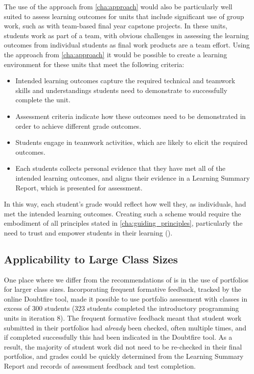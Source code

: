 The use of the approach from \cref{cha:approach} would also be particularly well suited to assess learning outcomes for units that include significant use of group work, such as with team-based final year capstone projects. In these units, students work as part of a team, with obvious challenges in assessing the learning outcomes from individual students as final work products are a team effort. Using the approach from \cref{cha:approach} it would be possible to create a learning environment for these units that meet the following criteria:
\begin{itemize}[noitemsep,nolistsep]
	\item Intended learning outcomes capture the required technical and teamwork skills and understandings students need to demonstrate to successfully complete the unit.
	\item Assessment criteria indicate how these outcomes need to be demonstrated in order to achieve different grade outcomes.
	\item Students engage in teamwork activities, which are likely to elicit the required outcomes.
	\item Each students collects personal evidence that they have met all of the intended learning outcomes, and aligns their evidence in a Learning Summary Report, which is presented for assessment.
\end{itemize}

In this way, each student's grade would reflect how well they, as individuals, had met the intended learning outcomes. Creating such a scheme would require the embodiment of all principles stated in \cref{cha:guiding_principles}, particularly the need to trust and empower students in their learning ().

\subsection{Applicability to Large Class Sizes} %
\label{sub:appli}


One place where we differ from the recommendations of \citet{Biggs:2007} is in the use of portfolios for larger class sizes. Incorporating frequent formative feedback, tracked by the online Doubtfire tool, made it possible to use portfolio assessment with classes in excess of 300 students (323 students completed the introductory programming units in iteration 8). The frequent formative feedback meant that student work submitted in their portfolios had \emph{already} been checked, often multiple times, and if completed successfully this had been indicated in the Doubtfire tool. As a result, the majority of student work did not need to be re-checked in their final portfolios, and grades could be quickly determined from the Learning Summary Report and records of assessment feedback and test completion.

